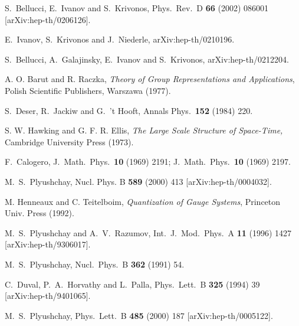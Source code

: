 \documentclass[a4paper,12pt]{article}
\begin{document}
\begin{thebibliography}{99}
S.~Bellucci, E.~Ivanov and S.~Krivonos,
Phys.\ Rev.\ D {\bf 66} (2002) 086001
[arXiv:hep-th/0206126].

E.~Ivanov, S.~Krivonos and J.~Niederle,
arXiv:hep-th/0210196.


S.~Bellucci, A.~Galajinsky, E.~Ivanov and S.~Krivonos,
arXiv:hep-th/0212204.


A. O. Barut and R. Raczka,
{\it Theory of Group Representations and Applications},
Polish Scientific Publishers, Warszawa (1977).


S.~Deser, R.~Jackiw and G.~'t Hooft,
Annals Phys.\  {\bf 152} (1984) 220.

S. W. Hawking and G. F. R. Ellis,
{\it The Large Scale Structure of Space-Time,}
Cambridge University Press (1973).


F.~Calogero,
J.\ Math.\ Phys.\  {\bf 10} (1969) 2191;
J.\ Math.\ Phys.\  {\bf 10} (1969) 2197.




M.~S.~Plyushchay,
Nucl. Phys. B {\bf 589} (2000) 413
[arXiv:hep-th/0004032].


M. Henneaux and C. Teitelboim,
{\it Quantization of Gauge Systems},
Princeton Univ. Press (1992).

M.~S.~Plyushchay and A.~V.~Razumov,
Int.\ J.\ Mod.\ Phys.\ A {\bf 11} (1996) 1427
[arXiv:hep-th/9306017].


M.~S.~Plyushchay,
Nucl.\ Phys.\ B {\bf 362} (1991) 54.


C.~Duval, P.~A.~Horvathy and L.~Palla,
Phys.\ Lett.\ B {\bf 325} (1994) 39
[arXiv:hep-th/9401065].


M.~S.~Plyushchay,
Phys.\ Lett.\ B {\bf 485} (2000) 187
[arXiv:hep-th/0005122].




\end{thebibliography}
\end{document}
